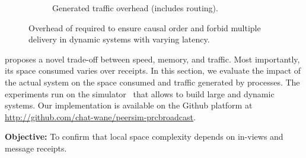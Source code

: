 \begin{figure}
\begin{center}
\begin{subfigure}[t]{0.495\textwidth}
      \caption{\label{fig:controlmessages}Generated traffic overhead (includes
        routing).}
    \end{subfigure}
    \caption{Overhead of \RPCBROADCAST required to ensure causal order and
      forbid multiple delivery in dynamic systems with varying latency.}
  \end{center}
\end{figure}


\RPCBROADCAST proposes a novel trade-off between speed, memory, and
traffic. Most importantly, its space consumed varies over receipts. In this
section, we evaluate the impact of the actual system on the space consumed and
traffic generated by processes. The experiments run on the \PEERSIM
simulator~\cite{montresor2009peersim} that allows to build large and dynamic
systems. Our implementation is available on the Github platform at
\url{http://github.com/chat-wane/peersim-prcbroadcast}.


%   

\noindent \textbf{Objective:} To confirm that local space complexity
depends on in-views and message receipts.

